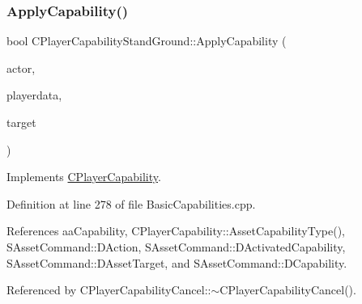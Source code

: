\subsubsection{\texorpdfstring{Apply\+Capability()}{ApplyCapability()}}
{\footnotesize\ttfamily bool C\+Player\+Capability\+Stand\+Ground\+::\+Apply\+Capability (\begin{DoxyParamCaption}\item[{std\+::shared\+\_\+ptr$<$ \hyperlink{classCPlayerAsset}{C\+Player\+Asset} $>$}]{actor,  }\item[{std\+::shared\+\_\+ptr$<$ \hyperlink{classCPlayerData}{C\+Player\+Data} $>$}]{playerdata,  }\item[{std\+::shared\+\_\+ptr$<$ \hyperlink{classCPlayerAsset}{C\+Player\+Asset} $>$}]{target }\end{DoxyParamCaption})\hspace{0.3cm}{\ttfamily [virtual]}}



Implements \hyperlink{classCPlayerCapability_a2ca6fd7fbd9c0178f1cf1d049c63825f}{C\+Player\+Capability}.



Definition at line 278 of file Basic\+Capabilities.\+cpp.



References aa\+Capability, C\+Player\+Capability\+::\+Asset\+Capability\+Type(), S\+Asset\+Command\+::\+D\+Action, S\+Asset\+Command\+::\+D\+Activated\+Capability, S\+Asset\+Command\+::\+D\+Asset\+Target, and S\+Asset\+Command\+::\+D\+Capability.



Referenced by C\+Player\+Capability\+Cancel\+::$\sim$\+C\+Player\+Capability\+Cancel().


